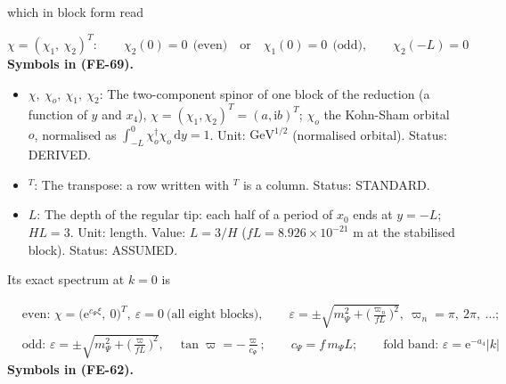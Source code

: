 \documentclass[
  10pt,
]{article}
\providecommand{\tightlist}{%
  \setlength{\itemsep}{0pt}\setlength{\parskip}{0pt}}
\begin{document}
which in block form read

\[
\chi = (\chi_1,\ \chi_2)^T:\qquad \chi_2(0) = 0\ \ \text{(even)}\quad\text{or}\quad \chi_1(0) =
 0\ \ \text{(odd)},\qquad
\chi_2(-L) = 0 \tag{FE-69}
\] \textbf{Symbols in (FE-69).}

\begin{itemize}
\tightlist
\item
  \(\chi,\ \chi_o,\ \chi_1,\ \chi_2\): The two-component spinor of one
  block of the reduction (a function of \(y\) and \(x_4\)),
  \(\chi = (\chi_1, \chi_2)^T = (a, \mathrm{i}b)^T\); \(\chi_o\) the
  Kohn-Sham orbital \(o\), normalised as
  \(\int_{-L}^{0}\chi_o^\dagger\chi_o\,\mathrm{d}y = 1\). Unit:
  \(\mathrm{GeV}^{1/2}\) (normalised orbital). Status: DERIVED.
\item
  \({}^T\): The transpose: a row written with \(^T\) is a column.
  Status: STANDARD.
\item
  \(L\): The depth of the regular tip: each half of a period of \(x_0\)
  ends at \(y = -L\); \(HL = 3\). Unit: length. Value: \(L = 3/H\)
  (\(fL = 8.926\times10^{-21}\) m at the stabilised block). Status:
  ASSUMED.
\end{itemize}

Its exact spectrum at \(k = 0\) is

\[
\begin{aligned}
&\text{even: }\chi = \big(\mathrm{e}^{c_\Psi\xi},\ 0\big)^T,\ \varepsilon = 0\ \text{(all eight
 blocks)},\qquad
 \varepsilon = \pm\sqrt{m_\Psi^2 + \Big(\frac{\varpi_n}{fL}\Big)^2},\ \varpi_n = \pi,\ 2\pi,\ \dots;\\
&\text{odd: }\varepsilon = \pm\sqrt{m_\Psi^2 + \Big(\frac{\varpi}{fL}\Big)^2},\quad \tan\varpi =
 -\frac{\varpi}{c_\Psi};\qquad
 c_\Psi = f\,m_\Psi L;\qquad \text{fold band: }\varepsilon = \mathrm{e}^{-a_4}\lvert k\rvert
\end{aligned} \tag{FE-62}
\] \textbf{Symbols in (FE-62).}
\end{document}
